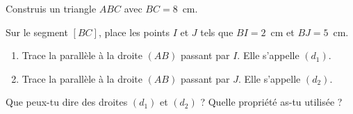 \begin{myenumerate}
  \item Construis un triangle $ABC$ avec $BC=8$~cm.
  \item Sur le segment $[BC]$, place les points $I$ et $J$ tels que
    $BI=2$~cm et $BJ=5$~cm.
  \item
    \begin{enumerate}
    \item Trace la parallèle à la droite $(AB)$ passant par $I$. Elle
      s'appelle $(d_1)$.
    \item  Trace la parallèle à la droite $(AB)$ passant par $J$. Elle
      s'appelle $(d_2)$.
    \end{enumerate}
  \item Que peux-tu dire des droites $(d_1)$ et $(d_2)$ ? Quelle
    propriété as-tu utilisée ?
\end{myenumerate}